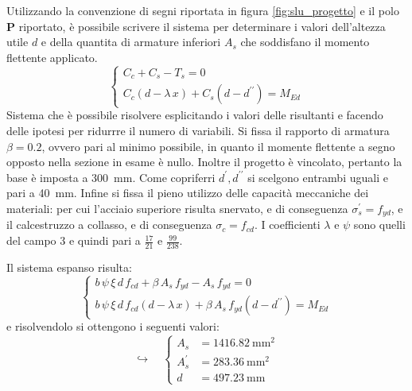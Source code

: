 Utilizzando la convenzione di segni riportata in figura \ref{fig:slu_progetto} e il polo $\mathbf{P}$ riportato, è possibile scrivere il sistema per determinare i valori dell'altezza utile $d$ e della quantita di armature inferiori $A_s$ che soddisfano il momento flettente applicato. 
\begin{equation}
  \begin{cases}
    C_c + C_s - T_s = 0 \\
    C_c \left(d - \lambda\,x\right) + C_s \left(d - d^{\prime\prime}\right) = M_{Ed}
  \end{cases}
\end{equation}
Sistema che è possibile risolvere esplicitando i valori delle risultanti e facendo delle ipotesi per ridurrre il numero di variabili. 
Si fissa il rapporto di armatura $\beta = 0.2$, ovvero pari al minimo possibile, in quanto il momente flettente a segno opposto nella sezione in esame è nullo.
Inoltre il progetto è vincolato, pertanto la base è imposta a \SI{300}{\milli\metre}.
Come copriferri $d^\prime,d^{\prime\prime}$ si scelgono entrambi uguali e pari a \SI{40}{\milli\metre}.
Infine si fissa il pieno utilizzo delle capacità meccaniche dei materiali: per cui l'acciaio superiore risulta snervato, e di conseguenza $\sigma_s^\prime = f_{yd}$, e il calcestruzzo a collasso, e di conseguenza $\sigma_c = f_{cd}$.
I coefficienti $\lambda$ e $\psi$ sono quelli del campo 3 e quindi pari a $\frac{17}{21}$ e $\frac{99}{238}$.

Il sistema espanso risulta:
\begin{equation}
  \begin{cases}
    b \, \psi \, \xi \, d \, f_{cd} + \beta \, A_s \, f_{yd} - A_s \, f_{yd} = 0 \\
    b \, \psi \, \xi \, d \, f_{cd} \left(d - \lambda\,x\right) + \beta \, A_s \, f_{yd} \left(d - d^{\prime\prime}\right) = M_{Ed}
  \end{cases}
\end{equation}
e risolvendolo si ottengono i seguenti valori:
\begin{equation}
  \hookrightarrow \quad
  \begin{cases}
    A_s &= \SI{1416.82}{\milli\metre\squared} \\
    A_s^\prime &= \SI{283.36}{\milli\metre\squared} \\
    d &= \SI{497.23}{\milli\metre}
  \end{cases}
\end{equation}

